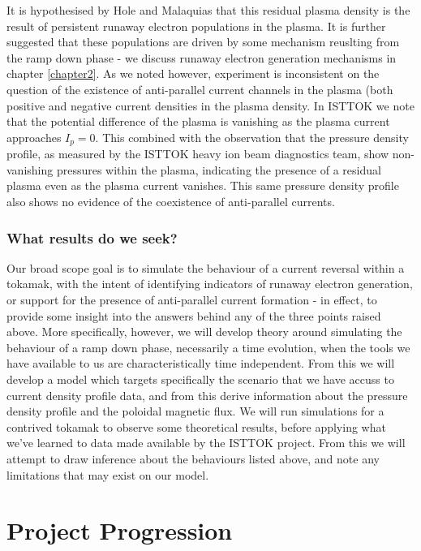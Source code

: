It is hypothesised by Hole and Malaquias that this residual plasma density is the result of 
persistent runaway electron populations in the plasma. It is further suggested that these populations
are driven by some mechanism reuslting from the ramp down phase - we discuss runaway electron generation 
mechanisms in chapter \ref{chapter2}. As we noted however, experiment is inconsistent on the question of 
the existence of anti-parallel current channels in the plasma (both positive and negative current densities 
in the plasma density. In ISTTOK we note that the potential difference of the plasma is vanishing as the plasma 
current approaches $I_p = 0$. This combined with the observation that the pressure density profile, as measured 
by the ISTTOK heavy ion beam diagnostics team, show non-vanishing pressures within the plasma, indicating 
the presence of a residual plasma even as the plasma current vanishes. This same pressure density profile 
also shows no evidence of the coexistence of anti-parallel currents.

\subsubsection{What results do we seek?}
Our broad scope goal is to simulate the behaviour of a current reversal within a tokamak, with the intent 
of identifying indicators of runaway electron generation, or support for the presence of anti-parallel current formation
- in effect, to provide some insight into the answers behind any of the three points raised above. 
More specifically, however, we will develop theory around simulating the behaviour of a ramp down phase, necessarily a time evolution, when 
the tools we have available to us are characteristically time independent. From this we will develop a model 
which targets specifically the scenario that we have accuss to current density profile data, and from this 
derive information about the pressure density profile and the poloidal magnetic flux. We will run simulations 
for a contrived tokamak to observe some theoretical results, before applying what we've learned to data 
made available by the ISTTOK project. From this we will attempt to draw inference about the behaviours listed 
above, and note any limitations that may exist on our model.

\section{Project Progression}

